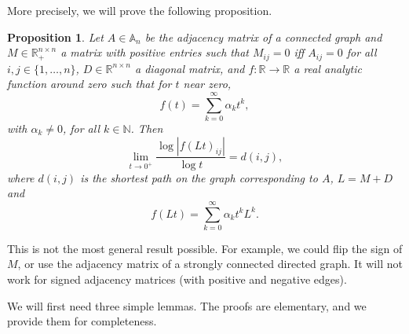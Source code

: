\documentclass[11pt]{article}
\def\N{\mathbb{N}}
\def\R{\mathbb{R}}
\def\log{\operatorname{log}}
\def\AA{\mathbb{A}}
\newtheorem{proposition}{Proposition}[section]
\theoremstyle{definition}
\begin{document}
More precisely, we will prove the following proposition.

\begin{proposition} \label{prop:varadhan-graph-general}
    Let $A\in\AA_n$ be the adjacency matrix of a connected graph and $M \in \R_+^{n\times n}$ a matrix with positive entries such that $M_{ij}=0$ iff $A_{ij}=0$ for all $i,j \in \{1,\dots,n\}$, $D \in \R^{n\times n}$ a diagonal matrix, and $f : \R \rightarrow \R$ a real analytic function around zero such that for $t$ near zero,
    $$ f(t) = \sum_{k=0}^\infty \alpha_k t^k, $$
    with $\alpha_k \neq 0$, for all $k\in \N$. Then 
    \begin{equation} \label{eq:varadhan-general} 
        \lim_{t\rightarrow 0^+} \frac{\log |f(L t)_{ij}|}{\log t} = d(i,j), 
    \end{equation}
    where $d(i,j)$ is the shortest path on the graph corresponding to $A$, $L=M+D$ and
    $$ f(L t) = \sum_{k=0}^\infty \alpha_k t^k L^k. $$
\end{proposition}

This is not the most general result possible. For example, we could flip the sign of $M$, or use the adjacency matrix of a strongly connected directed graph. It will not work for signed adjacency matrices (with positive and negative edges).

We will first need three simple lemmas. The proofs are elementary, and we provide them for completeness. 
\end{document}
